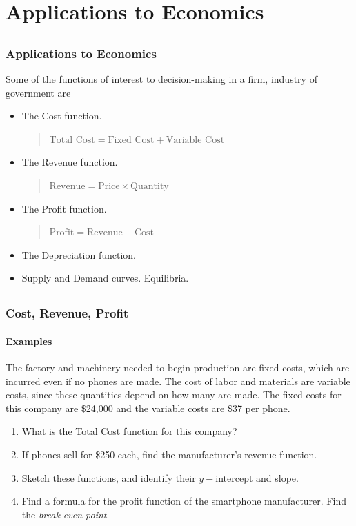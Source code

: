 \documentclass[9pt,xcolor=x11names,compress]{beamer}
\begin{document}
\section{Applications to Economics}
\subsection{}

\begin{frame}
\frametitle{Applications to Economics}
Some of the functions of interest to decision-making in a firm, industry of government are
\begin{itemize}
\item<1-> The \alert{Cost} function.
\begin{quotation}
$\text{Total Cost} = \text{Fixed Cost} + \text{Variable Cost}$
\end{quotation}
\item<2-> The \alert{Revenue} function.
\begin{quotation}
$\text{Revenue} = \text{Price} \times \text{Quantity}$
\end{quotation}
\item<3-> The \alert{Profit} function.
\begin{quotation}
$\text{Profit} = \text{Revenue} - \text{Cost}$
\end{quotation}
\item<4-> The \alert{Depreciation} function.
\item<5-> \alert{Supply} and \alert{Demand} curves. \alert{Equilibria}.
\end{itemize}
\end{frame}


\subsection{}

\begin{frame}
\frametitle{Cost, Revenue, Profit}
\framesubtitle{Examples}
\begin{example}
The factory and machinery needed to begin production are fixed costs, which are incurred even if no phones are made.  The cost of labor and materials are variable costs, since these quantities depend on how many are made.  The fixed costs for this company are \$24,000 and the variable costs are \$37 per phone. 
\begin{enumerate}
\item What is the Total Cost function for this company?
\item If phones sell for \$250 each, find the manufacturer's revenue function. 
\item Sketch these functions, and identify their $y-$intercept and slope.
\item Find a formula for the profit function of the smartphone manufacturer.  Find the \emph{break-even point}. 
\end{enumerate}
\end{example}
\end{frame}
\end{document}

